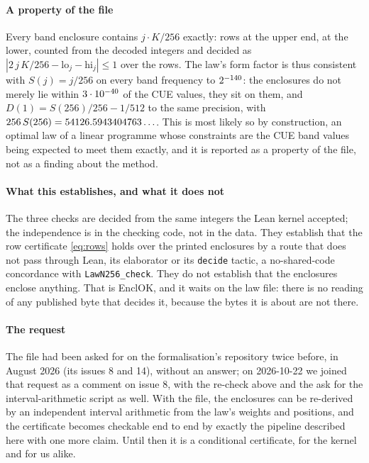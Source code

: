 \documentclass[preprint,11pt,authoryear,a4paper]{elsarticle}
\begin{document}
\paragraph{A property of the file} Every band enclosure contains $j\cdot K/256$ exactly: \RfCueUpper{} rows at the upper end, \RfCueLower{} at the lower, counted from the decoded integers and decided as $|2\,j\,K/256-\mathrm{lo}_j-\mathrm{hi}_j|\le1$ over the \RfBandRows{} rows. The law's form factor is thus consistent with $S(j)=j/256$ on every band frequency to $2^{-140}$: the enclosures do not merely lie within $3\cdot10^{-40}$ of the CUE values, they sit on them, and $D(1)=S(256)/256-1/512$ to the same precision, with $256\,S(256)=54126.5943404763\ldots$. This is most likely so by construction, an optimal law of a linear programme whose constraints are the CUE band values being expected to meet them exactly, and it is reported as a property of the file, not as a finding about the method.

\paragraph{What this establishes, and what it does not} The three checks are decided from the same integers the Lean kernel accepted; the independence is in the checking code, not in the data. They establish that the row certificate \eqref{eq:rows} holds over the printed enclosures by a route that does not pass through Lean, its elaborator or its \texttt{decide} tactic, a no-shared-code concordance with \texttt{LawN256\_check}. They do not establish that the enclosures enclose anything. That is EnclOK, and it waits on the law file: there is no reading of any published byte that decides it, because the bytes it is about are not there.

\paragraph{The request} The file had been asked for on the formalisation's repository twice before, in August 2026 (its issues 8 and 14), without an answer; on 2026-10-22 we joined that request as a comment on issue 8, with the re-check above and the ask for the interval-arithmetic script as well. With the file, the enclosures can be re-derived by an independent interval arithmetic from the law's weights and positions, and the certificate becomes checkable end to end by exactly the pipeline described here with one more claim. Until then it is a conditional certificate, for the kernel and for us alike.
\end{document}
